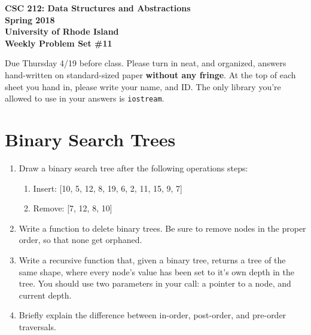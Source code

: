 \documentclass[11pt]{article}
\begin{document}
\thispagestyle{empty}

\begin{center}
    {\Large\bf CSC 212: Data Structures and Abstractions}\\
    \medskip
    {\Large\bf Spring 2018}\\
    \medskip
    {\Large\bf University of Rhode Island}\\
    \bigskip
    {\Large\bf Weekly Problem Set \#11}
\end{center}

Due Thursday 4/19 before class. Please turn in neat, and organized, answers hand-written on standard-sized paper \textbf{without any fringe}. At the top of each sheet you hand in, please write your name, and ID.
The only library you're allowed to use in your answers is \verb|iostream|.

\section{Binary Search Trees}
\begin{enumerate}
    \item Draw a binary search tree after the following operations steps:
    \begin{enumerate}
        \item Insert: [10, 5, 12, 8, 19, 6, 2, 11, 15, 9, 7]
        \item Remove: [7, 12, 8, 10]
    \end{enumerate}
    
    \item Write a function to delete binary trees. Be sure to remove nodes in the proper order, so that none get orphaned.

    \item Write a recursive function that, given a binary tree, returns a tree of the same shape, where every node's value has been set to it's own depth in the tree. You should use two parameters in your call: a pointer to a node, and current depth. 

    \item Briefly explain the difference between in-order, post-order, and pre-order traversals.
\end{enumerate}
\end{document}
